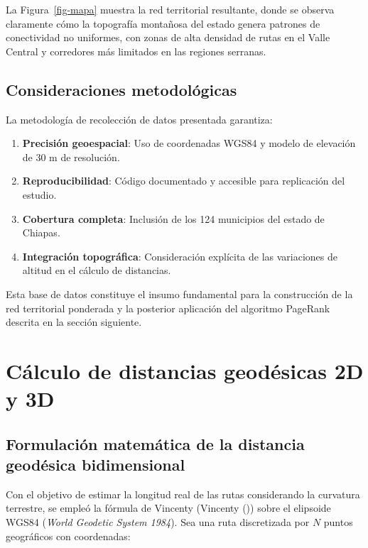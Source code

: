 \documentclass[
  spanish,
  us-letterpaper,
]{scrreprt}
\providecommand{\tightlist}{%
  \setlength{\itemsep}{0pt}\setlength{\parskip}{0pt}}
\numberwithin{equation}{section}
\begin{document}
La Figura~\ref{fig-mapa} muestra la red territorial resultante, donde se
observa claramente cómo la topografía montañosa del estado genera
patrones de conectividad no uniformes, con zonas de alta densidad de
rutas en el Valle Central y corredores más limitados en las regiones
serranas.

\subsection{Consideraciones
metodológicas}\label{consideraciones-metodoluxf3gicas}

La metodología de recolección de datos presentada garantiza:

\begin{enumerate}
\def\labelenumi{\arabic{enumi}.}
\tightlist
\item
  \textbf{Precisión geoespacial}: Uso de coordenadas WGS84 y modelo de
  elevación de 30 m de resolución.
\item
  \textbf{Reproducibilidad}: Código documentado y accesible para
  replicación del estudio.
\item
  \textbf{Cobertura completa}: Inclusión de los 124 municipios del
  estado de Chiapas.
\item
  \textbf{Integración topográfica}: Consideración explícita de las
  variaciones de altitud en el cálculo de distancias.
\end{enumerate}

Esta base de datos constituye el insumo fundamental para la construcción
de la red territorial ponderada y la posterior aplicación del algoritmo
PageRank descrita en la sección siguiente.

\section{Cálculo de distancias geodésicas 2D y
3D}\label{sec-distancias3d}

\subsection{Formulación matemática de la distancia geodésica
bidimensional}\label{formulaciuxf3n-matemuxe1tica-de-la-distancia-geoduxe9sica-bidimensional}

Con el objetivo de estimar la longitud real de las rutas considerando la
curvatura terrestre, se empleó la fórmula de Vincenty (Vincenty
()) sobre el elipsoide WGS84
(\emph{World Geodetic System 1984}). Sea una ruta discretizada por \(N\)
puntos geográficos con coordenadas:
\end{document}
